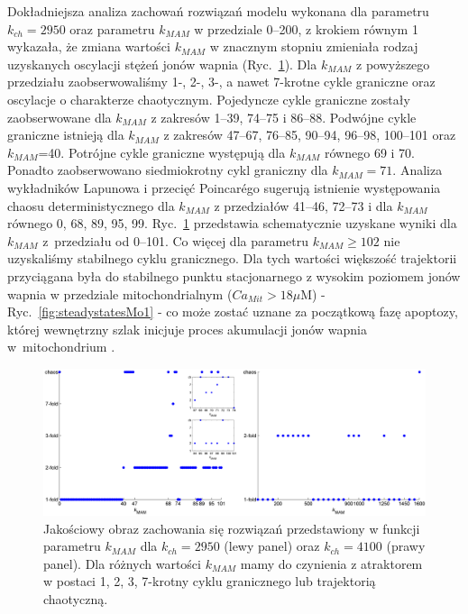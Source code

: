 	Dokładniejsza  analiza zachowań rozwiązań modelu wykonana dla parametru  $k_{ch} = 2950$ oraz parametru $k_{MAM}$ w przedziale 0--200, z krokiem równym 1 wykazała, że zmiana wartości $k_{MAM}$ w znacznym stopniu zmieniała rodzaj uzyskanych oscylacji stężeń jonów wapnia (Ryc.~\ref{fig:jakosciowy}). Dla $k_{MAM}$ z powyższego przedziału zaobserwowaliśmy 1-, 2-, 3-, a nawet 7-krotne cykle graniczne oraz oscylacje o charakterze chaotycznym. Pojedyncze cykle graniczne zostały zaobserwowane dla $k_{MAM}$ z zakresów 1--39, 74--75 i 86--88. Podwójne cykle graniczne istnieją dla $k_{MAM}$ z zakresów 47--67, 76--85, 90--94, 96--98, 100--101 oraz $k_{MAM}$=40. Potrójne cykle graniczne występują dla $k_{MAM}$ równego 69 i 70. Ponadto zaobserwowano siedmiokrotny cykl graniczny dla $k_{MAM}=71$. Analiza wykładników Lapunowa i przecięć Poincar\'ego sugerują istnienie występowania chaosu deterministycznego dla  $k_{MAM}$ z przedziałów 41--46, 72--73 i dla $k_{MAM}$ równego 0, 68, 89, 95, 99. Ryc.~\ref{fig:jakosciowy} przedstawia schematycznie uzyskane wyniki dla $k_{MAM}$ z~przedziału od 0--101. Co więcej dla parametru $k_{MAM} \geq 102$ nie uzyskaliśmy stabilnego cyklu granicznego. Dla tych wartości większość trajektorii przyciągana była do stabilnego punktu stacjonarnego z wysokim poziomem jonów wapnia w przedziale mitochondrialnym ($Ca_{Mit}>18 \mu$M) - Ryc.~\ref{fig:steadystatesMo1} - co może zostać uznane za początkową fazę apoptozy, której wewnętrzny szlak inicjuje proces akumulacji jonów wapnia w~mitochondrium \cite{Hajnoczky2006,Joseph2007,Roy2008}.

\begin{figure}
	\centering
	\includegraphics[width=1\textheight]{rysunki/rozdzial_5/jakosciowy}
	\caption[Jakościowa analiza rozwiązań Modelu \#1]{Jakościowy obraz zachowania się rozwiązań przedstawiony w funkcji parametru $k_{MAM}$ dla  $k_{ch}= 2950$ (lewy panel) oraz $k_{ch} = 4100$ (prawy panel). Dla różnych wartości $k_{MAM}$  mamy do czynienia z atraktorem w postaci  1, 2, 3, 7-krotny cyklu granicznego lub trajektorią chaotyczną.}
	\label{fig:jakosciowy}
\end{figure}

